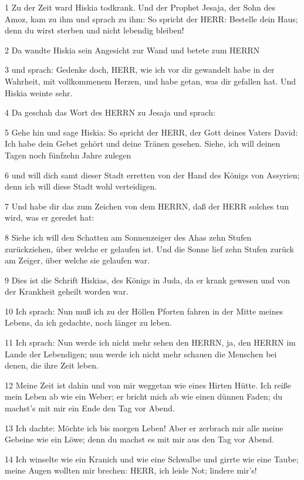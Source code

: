 \par 1 Zu der Zeit ward Hiskia todkrank. Und der Prophet Jesaja, der Sohn des Amoz, kam zu ihm und sprach zu ihm: So spricht der HERR: Bestelle dein Haus; denn du wirst sterben und nicht lebendig bleiben!
\par 2 Da wandte Hiskia sein Angesicht zur Wand und betete zum HERRN
\par 3 und sprach: Gedenke doch, HERR, wie ich vor dir gewandelt habe in der Wahrheit, mit vollkommenem Herzen, und habe getan, was dir gefallen hat. Und Hiskia weinte sehr.
\par 4 Da geschah das Wort des HERRN zu Jesaja und sprach:
\par 5 Gehe hin und sage Hiskia: So spricht der HERR, der Gott deines Vaters David: Ich habe dein Gebet gehört und deine Tränen gesehen. Siehe, ich will deinen Tagen noch fünfzehn Jahre zulegen
\par 6 und will dich samt dieser Stadt erretten von der Hand des Königs von Assyrien; denn ich will diese Stadt wohl verteidigen.
\par 7 Und habe dir das zum Zeichen von dem HERRN, daß der HERR solches tun wird, was er geredet hat:
\par 8 Siehe ich will den Schatten am Sonnenzeiger des Ahas zehn Stufen zurückziehen, über welche er gelaufen ist. Und die Sonne lief zehn Stufen zurück am Zeiger, über welche sie gelaufen war.
\par 9 Dies ist die Schrift Hiskias, des Königs in Juda, da er krank gewesen und von der Krankheit geheilt worden war.
\par 10 Ich sprach: Nun muß ich zu der Höllen Pforten fahren in der Mitte meines Lebens, da ich gedachte, noch länger zu leben.
\par 11 Ich sprach: Nun werde ich nicht mehr sehen den HERRN, ja, den HERRN im Lande der Lebendigen; nun werde ich nicht mehr schauen die Menschen bei denen, die ihre Zeit leben.
\par 12 Meine Zeit ist dahin und von mir weggetan wie eines Hirten Hütte. Ich reiße mein Leben ab wie ein Weber; er bricht mich ab wie einen dünnen Faden; du machst's mit mir ein Ende den Tag vor Abend.
\par 13 Ich dachte: Möchte ich bis morgen Leben! Aber er zerbrach mir alle meine Gebeine wie ein Löwe; denn du machst es mit mir aus den Tag vor Abend.
\par 14 Ich winselte wie ein Kranich und wie eine Schwalbe und girrte wie eine Taube; meine Augen wollten mir brechen: HERR, ich leide Not; lindere mir's!
